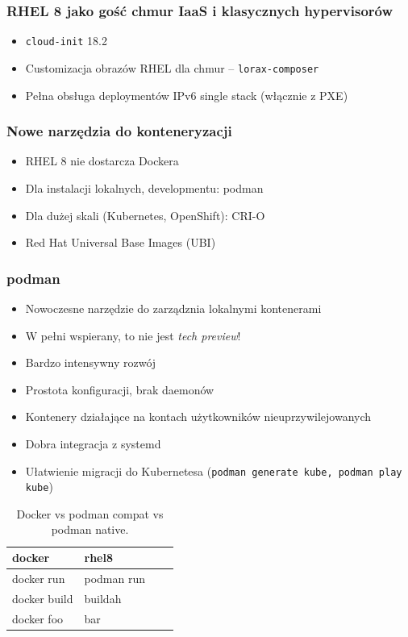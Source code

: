 \documentclass[dvipsnames,table]{beamer}
\begin{document}

%

\begin{frame}
	\frametitle{RHEL 8 jako gość chmur IaaS i klasycznych hypervisorów}
\begin{itemize}
	\item {\tt cloud-init} 18.2
	\item Customizacja obrazów RHEL dla chmur -- {\tt lorax-composer}
	\item Pełna obsługa deploymentów IPv6 single stack (włącznie z PXE)
\end{itemize}
\end{frame}

\begin{frame}
	\frametitle{Nowe narzędzia do konteneryzacji}
\begin{itemize}
	\item RHEL 8 nie dostarcza Dockera
	\item Dla instalacji lokalnych, developmentu: podman
	\item Dla dużej skali (Kubernetes, OpenShift): CRI-O
	\item Red Hat Universal Base Images (UBI)
\end{itemize}
\end{frame}

\begin{frame}
	\frametitle{podman}
	\begin{itemize}
		\item Nowoczesne narzędzie do zarządznia lokalnymi kontenerami
		\item W pełni wspierany, to nie jest {\em tech preview}!
		\item Bardzo intensywny rozwój
		\item Prostota konfiguracji, brak daemonów
		\item Kontenery działające na kontach użytkowników nieuprzywilejowanych
		\item Dobra integracja z systemd
		\item Ułatwienie migracji do Kubernetesa ({\tt podman generate kube, podman play kube})
	\end{itemize}
\centering
	\begin{table}
\caption{Docker vs podman compat vs podman native.}
\label{porownanie}
\scriptsize
\begin{tabular}{llll}
\hline
docker & rhel8    \\ \hline
docker run & podman run \\
docker build & buildah  \\
docker foo & bar \\ \hline
\end{tabular}
\normalsize
\end{table}
\end{frame}
\end{document}
